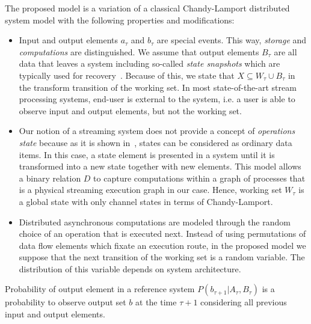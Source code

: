 The proposed model is a variation of a classical Chandy-Lamport distributed system model with the following properties and modifications:

\begin{itemize}
    \item Input and output elements $a_\tau$ and $b_\tau$ are special events. This way, {\em storage} and {\em computations} are distinguished. We assume that output elements $B_\tau$ are all data that leaves a system including so-called {\em state snapshots} which are typically used for recovery~\cite{Carbone:2017:SMA:3137765.3137777}. Because of this, we state that $X \subseteq W_\tau \cup B_\tau$ in the transform transition of the working set. In most state-of-the-art stream processing systems, end-user is external to the system, i.e. a user is able to observe input and output elements, but not the working set.
    \item Our notion of a streaming system does not provide a concept of {\em operations state} because as it is shown in~\cite{we2018adbis}, states can be considered as ordinary data items. In this case, a state element is presented in a system until it is transformed into a new state together with new elements. This model allows a binary relation $D$ to capture computations within a graph of processes that is a physical streaming execution graph in our case. Hence, working set $W_\tau$ is a global state with only channel states in terms of Chandy-Lamport.
    \item Distributed asynchronous computations are modeled through the random choice of an operation that is executed next. Instead of using permutations of data flow elements which fixate an execution route, in the proposed model we suppose that the next transition of the working set is a random variable. The distribution of this variable depends on system architecture. 
\end{itemize}


\begin{definition}{Probability of output element in a reference system}
$P(b_{\tau+1}|A_{\tau}, B_\tau)$ is a probability to observe output set $b$ at the time $\tau+1$ considering all previous input and output elements.
\end{definition}

